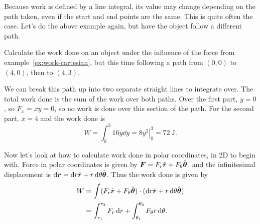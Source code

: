 \documentclass[../classical_mechanics.tex]{subfiles}
\begin{document}
            Because work is defined by a line integral, its value may change depending on the path taken, even if the start and end points are the same.
            This is quite often the case.
            Let's do the above example again, but have the object follow a different path.
            \begin{example}
                Calculate the work done on an object under the influence of the force from example~\ref{ex:work-cartesian}, but this time following a path from $(0,0)$ to $(4,0)$, then to $(4,3)$.

                We can break this path up into two separate straight lines to integrate over.
                The total work done is the sum of the work over both paths.
                Over the first part, $y=0$, so $F_x=xy=0$, so no work is done over this section of the path.
                For the second part, $x=4$ and the work done is
                \begin{equation}
                    W=\int_0^3 16y\dd{y}=\left.8y^2\right|_0^3=\qty{72}{\joule}.
                \end{equation}
            \end{example}

            Now let's look at how to calculate work done in polar coordinates, in 2D to begin with.
            Force in polar coordinates is given by $\boldsymbol{F}=F_r\hat{\boldsymbol{r}}+F_\theta\hat{\boldsymbol{\theta}}$, and the infinitesimal displacement is $\dd{\vec{r}}=\dd{r}\uvec{r}+r\dd{\theta}\uvec{\theta}$.
            Thus the work done is given by
            \begin{align}
                W&=\int(F_r\uvec{r}+F_\theta\uvec{\theta})\cdot(\dd{r}\uvec{r}+r\dd{\theta}\uvec{\theta})\\
                &=\int_{r_1}^{r_2}F_r\dd{r}+\int_{\theta_1}^{\theta_2}F_\theta r\dd{\theta}\label{eq:work-integral-2d-polar}.
            \end{align}
            \begin{example}\label{ex:work-polar}
                
            \end{example}
\end{document}
